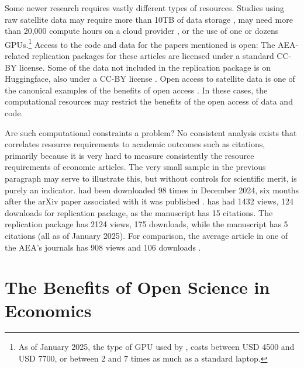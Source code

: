\documentclass{article}
\begin{document}
Some newer research requires vastly different types of resources. Studies using raw satellite data may require more than 10TB of data storage \citep{khachiyan_using_2022,khachiyan_data_2022}, may need more than 20,000 compute hours on a cloud provider \citep{rudik_optimal_2020,rudik_data_2020}, or the use of one \citep{dell_deep_2024,dell_data_2025} or dozens \citep{khachiyan_data_2022} \acp{GPU}.\footnote{As of January 2025, the type of \ac{GPU} used by \citet{dell_data_2025}, costs between USD 4500 and USD 7700, or between 2 and 7 times as much as a standard laptop.} Access to the code and data for the papers mentioned is open: The AEA-related replication packages for these articles are licensed under a standard \ac{CC-BY} license. Some of the data not included in the \citet{dell_data_2025} replication package is on Huggingface, also under a \ac{CC-BY} license \citep{silcock_newswire_2024}. Open access to satellite data is one of the canonical examples of the benefits of open access \citep{nagaraj_improving_2020}. In these cases, the computational resources may restrict the benefits of the open access of data and code.

Are such computational constraints a problem? No consistent analysis exists that correlates resource requirements to academic outcomes such as citations, primarily because it is very hard to measure consistently the resource requirements of economic articles. The very small sample in the previous paragraph may serve to illustrate this, but without controls for scientific merit, is purely an indicator. \citet{silcock_newswire_2024} had been downloaded 98 times in December 2024, six months after the arXiv paper associated with it was published \citep{silcock_newswire_2024}. \citet{rudik_data_2020} has had  1432 views, 124 downloads for replication package, as the manuscript \citep{rudik_optimal_2020} has 15 citations. The replication package \citet{khachiyan_data_2022} has  2124 views, 175 downloads, while the manuscript \citep{khachiyan_using_2022} has 5 citations (all as of January 2025). For comparison, the average article in one of the \ac{AEA}'s journals has 908 views and 106 downloads \citep[Table 4]{vilhuber_report_2025}.

%

\section{The Benefits of Open Science in Economics}
\label{sec:benefits}
\end{document}
